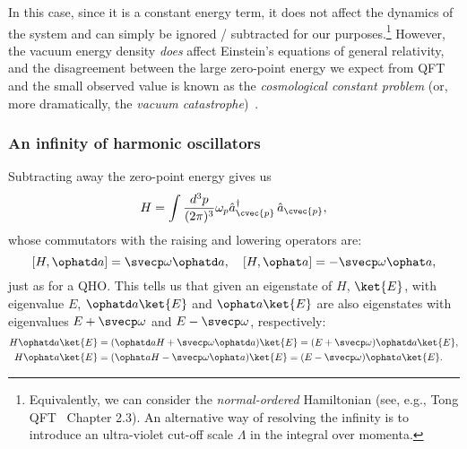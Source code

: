 In this case, since it is a constant energy term, it does not affect the dynamics of the system and can simply be ignored / subtracted for our purposes.\footnote{Equivalently, we can consider the \textit{normal-ordered} Hamiltonian (see, e.g., Tong QFT~\cite{TongQFT} Chapter 2.3).
An alternative way of resolving the infinity is to introduce an ultra-violet cut-off scale $\Lambda$ in the integral over momenta.}
However, the vacuum energy density \textit{does} affect Einstein's equations of general relativity, and the disagreement between the large zero-point energy we expect from QFT and the small observed value is known as the \textit{cosmological constant problem} (or, more dramatically, the \textit{vacuum catastrophe})~\cite{Adler:1995vd, Bengochea:2019daa}.

\subsubsection{An infinity of harmonic oscillators}

Subtracting away the zero-point energy gives us
\begin{equation}
    \label{eq:01_qft_quantization_hamiltonian}
    H = \int \frac{d^3p}{(2\pi)^3} \omega_p \hat a^\dagger_{\cvec{p}}\,\hat a_{\cvec{p}},
\end{equation}
whose commutators with the raising and lowering operators are:
\begin{equation}
    \label{eq:01_qft_quantization_hamiltonian_commutators}
    [H, \ophatd a] = \svecp \omega \ophatd a, \quad [H, \ophat a] = -\svecp \omega \ophat a,
\end{equation}
just as for a QHO.
This tells us that given an eigenstate of $H$, $\ket{E}$, with eigenvalue $E$, $\ophatd a \ket{E}$ and $\ophat a \ket{E}$ are also eigenstates with eigenvalues $E + \svecp \omega$ and $E - \svecp \omega$, respectively:
\begin{equation}
    \label{eq:01_qft_quantization_hamiltonian_eigenstates}
    \begin{split}
        H\ophatd a \ket{E} &= (\ophatd a H + \svecp \omega \ophatd a) \ket{E} = (E + \svecp \omega) \ophatd a \ket{E}, \\
        H\ophat a \ket{E} &= (\ophat a H - \svecp \omega \ophat a) \ket{E} = (E - \svecp \omega) \ophat a \ket{E}.
    \end{split}
\end{equation}

